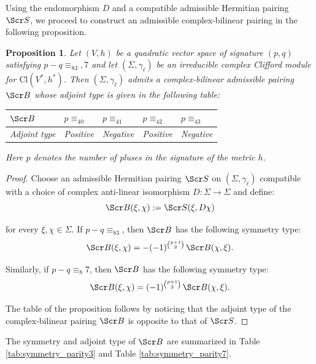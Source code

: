 \documentclass[10pt,a4paper,twoside,reqno]{amsart}
\theoremstyle{plain}
\newtheorem{prop}[thm]{Proposition}
\theoremstyle{definition}
\theoremstyle{remark}
\def\scB{\Scr B}
\def\scS{\Scr S}
\def\Cl{\mathrm{Cl}}
\begin{document}
\noindent
Using the endomorphism $D$ and a compatible admissible Hermitian pairing $\scS$, we proceed to construct an admissible complex-bilinear pairing in the following proposition.

\begin{prop}
\label{prop:B_D_admissible}
Let $(V,h)$ be a quadratic vector space of signature $(p,q)$ satisfying $p-q\equiv_83,7$ and let $(\Sigma,\gamma_\ell)$ be an irreducible complex Clifford module for $\Cl(V^*,h^*)$. Then $(\Sigma,\gamma_\ell)$ admits a complex-bilinear admissible pairing $\scB$ whose adjoint type is given in the following table:  
\begin{table}[H]
\centering
\begin{tabular}{l|llll}
\hline
$\scB $&$p\equiv_40$&$p\equiv_41$&$p\equiv_42$&$p\equiv_43$\\
\hline
Adjoint type & Positive & Negative & Positive & Negative\\
\hline
\end{tabular}
\end{table}

\noindent
Here $p$ denotes the number of pluses in the signature of the metric $h$.
\end{prop}

\begin{proof}
Choose an admissible Hermitian pairing $\scS$ on $(\Sigma,\gamma_\ell)$ compatible with a choice of complex anti-linear isomorphism $D\colon \Sigma \to \Sigma$ and define:
\begin{equation*}
\scB(\xi,\chi) := \scS(\xi, D\chi)
\end{equation*}

\noindent
for every $\xi, \chi \in \Sigma$. If $p-q\equiv_83$, then $\scB$ has the following symmetry type:
\begin{equation*}
\scB(\xi,\chi) = -(-1)^{\binom{p+1}{2}}\, \scB(\chi,\xi).
\end{equation*}

\noindent
Similarly, if $p-q\equiv_8 7$, then $\scB$ has the following symmetry type:
\begin{equation*}
\scB(\xi,\chi) = (-1)^{\binom{p+1}{2}}\, \scB(\chi,\xi).
\end{equation*}

\noindent
The table of the proposition follows by noticing that the adjoint type of the complex-bilinear pairing $\scB$ is opposite to that of $\scS$.
\end{proof}

\noindent
The symmetry and adjoint type of $\scB$ are summarized in Table \ref{tab:symmetry_parity3} and Table \ref{tab:symmetry_parity7}.
\end{document}
